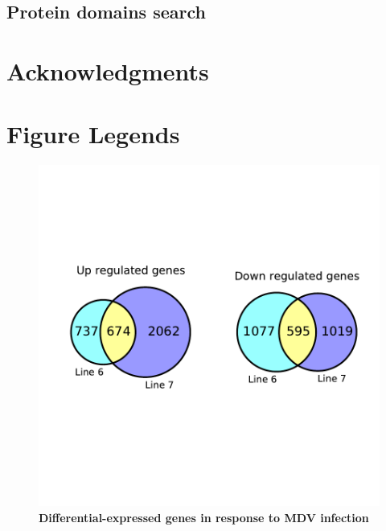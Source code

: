 \documentclass[10pt]{article}
\begin{document}
\subsection{Protein domains search}

\section*{Acknowledgments}

{}

\section*{Figure Legends}

\begin{figure}[!ht]
    \begin{center}
        \includegraphics[width=6in]{degenes_venn.pdf}
    \end{center}
    \caption{
        {\bf Differential-expressed genes in response to MDV infection}
    }
    \label{degenes_venn}
\end{figure}
\end{document}
